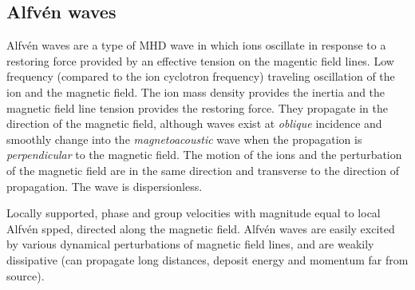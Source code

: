 \documentclass[12pt]{article}
\begin{document}
\subsection*{Alfv\'en waves}
Alfv\'en waves are a type of MHD wave in which ions oscillate in response to a 
restoring force provided by an effective tension on the magentic field lines.
Low frequency (compared to the ion cyclotron frequency) traveling
oscillation of the ion and the magnetic field. The ion mass
density provides the inertia and the magnetic field line
tension provides the restoring force.
They propagate in the direction of the magnetic field, although waves exist
at \emph{oblique} incidence and smoothly change into the \emph{magnetoacoustic}
wave when the propagation is \emph{perpendicular} to the magnetic field.
The motion of the ions and the perturbation of the magnetic
field are in the same direction and transverse to the direction of
propagation. The wave is dispersionless.

Locally supported, phase and group velocities with magnitude equal to
local Alfv\'en spped, directed along the magnetic field.
Alfv\'en waves are easily excited by various dynamical perturbations of
magnetic field lines, and are
weakily dissipative (can propagate long distances, deposit energy
and momentum far from source).
\end{document}
